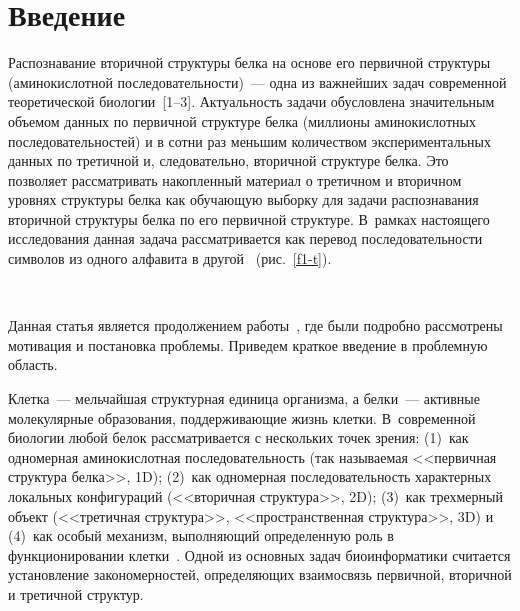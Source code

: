       \begin{multicols}{2}

            \label{st\stat}

\section{Введение}

Распознавание вторичной структуры белка на основе его первичной
структуры (аминокислотной последовательности)~--- одна из важнейших
задач современной теоретической биологии~[1--3]. Актуальность задачи
обусловлена значительным объемом данных по первичной структуре белка
(миллионы аминокислотных последовательностей) и в сотни раз меньшим
количеством экспериментальных данных по третичной и, следовательно,
вторичной структуре белка. Это позволяет рассматривать накопленный
материал о третичном и вторичном уровнях структуры белка как обучающую
выборку для задачи распознавания вторичной структуры белка по его
первичной структуре. В~рамках настоящего исследования данная задача
рассматривается как перевод последовательности символов из одного
алфавита в другой~\cite{3-t} (рис.~\ref{f1-t}).

\begin{figure*} %
\vspace*{1pt}
 \begin{center}
 \mbox{%
 \epsfxsize=163.944mm
 }
 \end{center}
 \vspace*{-9pt}
\end{figure*}

Данная статья является продолжением работы~\cite{3-t}, где были подробно
рассмотрены мотивация и постановка проблемы. Приведем краткое введение
в проблемную область.

Клетка~--- мельчайшая структурная единица организма, а белки~--- активные
молекулярные образования, поддерживающие жизнь клетки. В~современной
биологии любой белок рассматривается с нескольких точек зрения: (1)~как
одномерная аминокислотная последовательность (так на\-зы\-ва\-емая <<первичная
структура белка>>, 1D); (2)~как одномерная последовательность характерных
локальных конфигураций (<<вторичная структура>>, 2D); (3)~как
трехмерный объект (<<третичная структура>>, <<пространственная
структура>>, 3D) и (4)~как особый механизм, выполняющий определенную
роль в функционировании клетки~\cite{1-t}. Одной из основных задач
биоинформатики считается установление закономерностей, определяющих
взаимосвязь первичной, вторичной и третичной структур.


\end{multicols}
